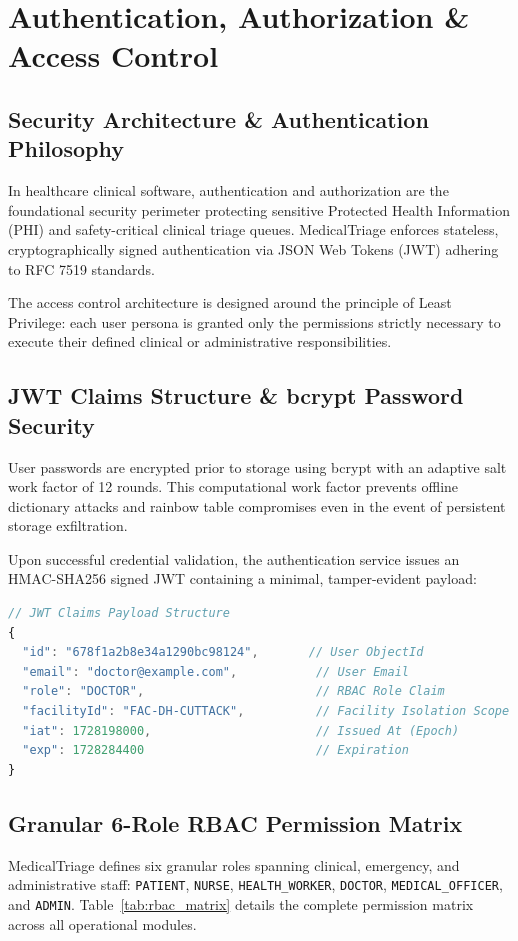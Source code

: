 \documentclass[11pt,a4paper,oneside]{report}
\begin{document}
\chapter{Authentication, Authorization \& Access Control}

\section{Security Architecture \& Authentication Philosophy}
In healthcare clinical software, authentication and authorization are the foundational security perimeter protecting sensitive Protected Health Information (PHI) and safety-critical clinical triage queues. MedicalTriage enforces stateless, cryptographically signed authentication via JSON Web Tokens (JWT) adhering to RFC 7519 standards.

The access control architecture is designed around the principle of Least Privilege: each user persona is granted only the permissions strictly necessary to execute their defined clinical or administrative responsibilities.

\section{JWT Claims Structure \& bcrypt Password Security}
User passwords are encrypted prior to storage using bcrypt with an adaptive salt work factor of 12 rounds. This computational work factor prevents offline dictionary attacks and rainbow table compromises even in the event of persistent storage exfiltration.

Upon successful credential validation, the authentication service issues an HMAC-SHA256 signed JWT containing a minimal, tamper-evident payload:
\begin{lstlisting}[language=JavaScript]
// JWT Claims Payload Structure
{
  "id": "678f1a2b8e34a1290bc98124",       // User ObjectId
  "email": "doctor@example.com",           // User Email
  "role": "DOCTOR",                        // RBAC Role Claim
  "facilityId": "FAC-DH-CUTTACK",          // Facility Isolation Scope
  "iat": 1728198000,                       // Issued At (Epoch)
  "exp": 1728284400                        // Expiration
}
\end{lstlisting}

\section{Granular 6-Role RBAC Permission Matrix}
MedicalTriage defines six granular roles spanning clinical, emergency, and administrative staff: \texttt{PATIENT}, \texttt{NURSE}, \texttt{HEALTH\_WORKER}, \texttt{DOCTOR}, \texttt{MEDICAL\_OFFICER}, and \texttt{ADMIN}. Table~\ref{tab:rbac_matrix} details the complete permission matrix across all operational modules.
\end{document}
